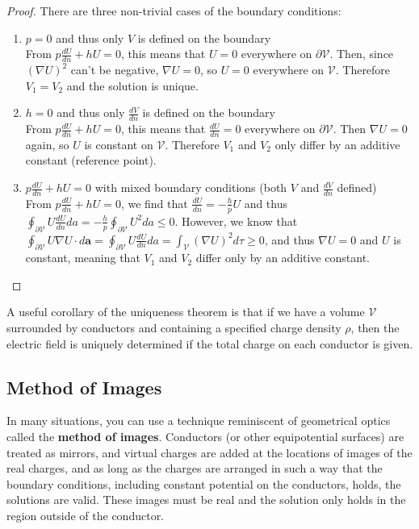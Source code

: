 \documentclass{article}
\begin{document}
\begin{proof}
    There are three non-trivial cases of the boundary conditions:
    \begin{enumerate}
        \item \(p=0\) and thus only \(V\) is defined on the boundary \\
        From \(p\frac{dU}{dn}+hU=0\), this means that \(U=0\) everywhere on \(\partial \mathscr{V}\). Then, since \((\nabla U)^2\) can't be negative, \(\nabla U=0\), so \(U=0\) everywhere on \(\mathscr{V}\). Therefore \(V_1=V_2\) and the solution is unique. 
        \item \(h=0\) and thus only \(\frac{dV}{dn}\) is defined on the boundary \\
        From \(p\frac{dU}{dn}+hU=0\), this means that \(\frac{dU}{dn}=0\) everywhere on \(\partial \mathscr{V}\). Then \(\nabla U=0\) again, so \(U\) is constant on \(\mathscr{V}\). Therefore \(V_1\) and \(V_2\) only differ by an additive constant (reference point).
        \item \(p\frac{dU}{dn}+hU=0\) with mixed boundary conditions (both \(V\) and \(\frac{dV}{dn}\) defined) \\
        From \(p\frac{dU}{dn}+hU=0\), we find that \(\frac{dU}{dn}=-\frac{h}{p}U\) and thus \(\oint_{\partial \mathscr{V}}U\frac{dU}{dn}da=-\frac{h}{p}\oint_{\partial \mathscr{V}}U^2 da \leq 0\). However, we know that \(\oint_{\partial \mathscr{V}} U \nabla U \cdot d \mathbf{a} =\oint_{\partial \mathscr{V}} U\frac{dU}{dn}da=\int_{\mathscr{V}}(\nabla U)^2 d \tau \geq 0\), and thus \(\nabla U=0\) and \(U\) is constant, meaning that \(V_1\) and \(V_2\) differ only by an additive constant.      
    \end{enumerate}    
\end{proof}

A useful corollary of the uniqueness theorem is that if we have a volume \(\mathscr{V}\) surrounded by conductors and containing a specified charge density \(\rho \), 
then the electric field is uniquely determined if the total charge on each conductor is given.  

\subsection{Method of Images}
In many situations, you can use a technique reminiscent of geometrical optics called the \textbf{method of images}. Conductors (or other 
equipotential surfaces) are treated as mirrors, and virtual charges are added at the locations of images of the real charges, and as long 
as the charges are arranged in such a way that the boundary conditions, including constant potential on the conductors, holds, the solutions are valid. These images must be real 
and the solution only holds in the region outside of the conductor.
\end{document}
